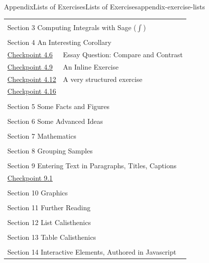 \documentclass[twoside,10pt,]{article}
\numberwithin{equation}{section}
\begin{document}
\begin{appendixptx}{Appendix}{Lists of Exercises}{}{Lists of Exercises}{}{}{appendix-exercise-lists}
\begin{longtable}[l]{ll}
\multicolumn{2}{l}{\null}\\[1.5ex] \multicolumn{2}{l}{\large Section 3 Computing Integrals with Sage (\(\int\))}\\[0.5ex]
\multicolumn{2}{l}{\null}\\[1.5ex] \multicolumn{2}{l}{\large Section 4 An Interesting Corollary}\\[0.5ex]
\hyperref[exercise-essay]{Checkpoint 4.6}& Essay Question: Compare and Contrast\\
\hyperref[inline-exercise]{Checkpoint 4.9}& An Inline Exercise\\
\hyperref[exercise-structured]{Checkpoint 4.12}& A very structured exercise\\
\hyperref[subsection-intro-conclude-4-3]{Checkpoint 4.16}& \\
\multicolumn{2}{l}{\null}\\[1.5ex] \multicolumn{2}{l}{\large Section 5 Some Facts and Figures}\\[0.5ex]
\multicolumn{2}{l}{\null}\\[1.5ex] \multicolumn{2}{l}{\large Section 6 Some Advanced Ideas}\\[0.5ex]
\multicolumn{2}{l}{\null}\\[1.5ex] \multicolumn{2}{l}{\large Section 7 Mathematics}\\[0.5ex]
\multicolumn{2}{l}{\null}\\[1.5ex] \multicolumn{2}{l}{\large Section 8 Grouping Samples}\\[0.5ex]
\multicolumn{2}{l}{\null}\\[1.5ex] \multicolumn{2}{l}{\large Section 9 Entering Text in Paragraphs, Titles, Captions}\\[0.5ex]
\hyperref[subsection-xml-escape-7]{Checkpoint 9.1}& \\
\multicolumn{2}{l}{\null}\\[1.5ex] \multicolumn{2}{l}{\large Section 10 Graphics}\\[0.5ex]
\multicolumn{2}{l}{\null}\\[1.5ex] \multicolumn{2}{l}{\large Section 11 Further Reading}\\[0.5ex]
\multicolumn{2}{l}{\null}\\[1.5ex] \multicolumn{2}{l}{\large Section 12 List Calisthenics}\\[0.5ex]
\multicolumn{2}{l}{\null}\\[1.5ex] \multicolumn{2}{l}{\large Section 13 Table Calisthenics}\\[0.5ex]
\multicolumn{2}{l}{\null}\\[1.5ex] \multicolumn{2}{l}{\large Section 14 Interactive Elements, Authored in Javascript}\\[0.5ex]

\end{longtable}
\end{appendixptx}
\end{document}
